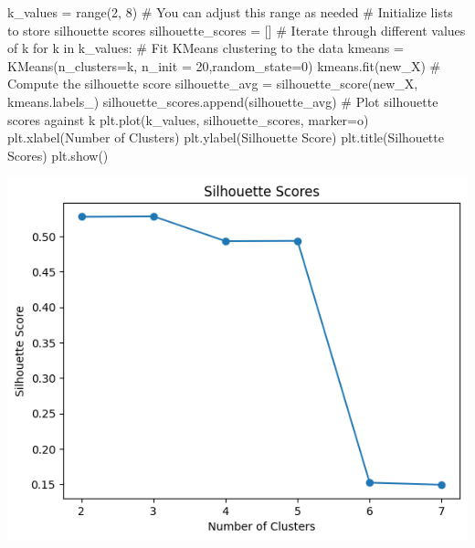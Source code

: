 \documentclass[
  11pt,
  letterpaper,
  DIV=11,
  numbers=noendperiod]{scrartcl}
\newenvironment{Shaded}{\begin{snugshade}}{\end{snugshade}}
\newcommand{\BuiltInTok}[1]{\textcolor[rgb]{0.00,0.23,0.31}{#1}}
\newcommand{\CommentTok}[1]{\textcolor[rgb]{0.37,0.37,0.37}{#1}}
\newcommand{\ControlFlowTok}[1]{\textcolor[rgb]{0.00,0.23,0.31}{#1}}
\newcommand{\DecValTok}[1]{\textcolor[rgb]{0.68,0.00,0.00}{#1}}
\newcommand{\KeywordTok}[1]{\textcolor[rgb]{0.00,0.23,0.31}{#1}}
\newcommand{\NormalTok}[1]{\textcolor[rgb]{0.00,0.23,0.31}{#1}}
\newcommand{\OperatorTok}[1]{\textcolor[rgb]{0.37,0.37,0.37}{#1}}
\newcommand{\StringTok}[1]{\textcolor[rgb]{0.13,0.47,0.30}{#1}}
\begin{document}
\begin{Shaded}
\begin{Highlighting}[]
\NormalTok{k\_values }\OperatorTok{=} \BuiltInTok{range}\NormalTok{(}\DecValTok{2}\NormalTok{, }\DecValTok{8}\NormalTok{) }\CommentTok{\# You can adjust this range as needed}
\CommentTok{\# Initialize lists to store silhouette scores}
\NormalTok{silhouette\_scores }\OperatorTok{=}\NormalTok{ []}
\CommentTok{\# Iterate through different values of k}
\ControlFlowTok{for}\NormalTok{ k }\KeywordTok{in}\NormalTok{ k\_values:}
\CommentTok{\# Fit KMeans clustering to the data}
\NormalTok{    kmeans }\OperatorTok{=}\NormalTok{ KMeans(n\_clusters}\OperatorTok{=}\NormalTok{k, n\_init }\OperatorTok{=} \DecValTok{20}\NormalTok{,random\_state}\OperatorTok{=}\DecValTok{0}\NormalTok{)}
\NormalTok{    kmeans.fit(new\_X)}
\CommentTok{\# Compute the silhouette score}
\NormalTok{    silhouette\_avg }\OperatorTok{=}\NormalTok{ silhouette\_score(new\_X, kmeans.labels\_)}
\NormalTok{    silhouette\_scores.append(silhouette\_avg)}
\CommentTok{\# Plot silhouette scores against k}
\NormalTok{plt.plot(k\_values, silhouette\_scores, marker}\OperatorTok{=}\StringTok{\textquotesingle{}o\textquotesingle{}}\NormalTok{)}
\NormalTok{plt.xlabel(}\StringTok{\textquotesingle{}Number of Clusters\textquotesingle{}}\NormalTok{)}
\NormalTok{plt.ylabel(}\StringTok{\textquotesingle{}Silhouette Score\textquotesingle{}}\NormalTok{)}
\NormalTok{plt.title(}\StringTok{\textquotesingle{}Silhouette Scores\textquotesingle{}}\NormalTok{)}
\NormalTok{plt.show()}
\end{Highlighting}
\end{Shaded}

\includegraphics{Assignment6_Final version_files/figure-pdf/cell-22-output-1.png}
\end{document}
